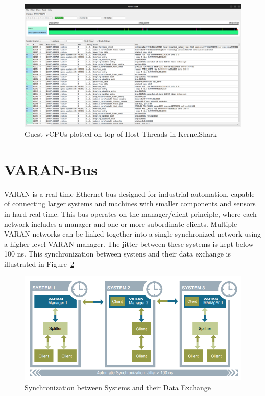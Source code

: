 \documentclass[MMR,Master,english]{twbook}
\begin{document}
\begin{figure}[H]
	\centering
	\includegraphics[width=1.0\columnwidth]{img/kernelshark_combo.png}
	\caption[Guest vCPUs plotted on top of Host Threads in KernelShark]{Guest vCPUs plotted on top of Host Threads in KernelShark}
	\label{fig:kernelshark_combo}
\end{figure}

\section{VARAN-Bus}\label{sec:varan}

VARAN is a real-time Ethernet bus designed for industrial automation, capable of connecting larger systems and machines with smaller components and sensors in hard real-time. This bus operates on the manager/client principle, where each network includes a manager and one or more subordinate clients. Multiple VARAN networks can be linked together into a single synchronized network using a higher-level VARAN manager. The jitter between these systems is kept below 100 ns. This synchronization between systens and their data exchange is illustrated in Figure~\ref{fig:multiple_varans}

\begin{figure}[H]
	\centering
	\includegraphics[width=0.75\columnwidth]{img/multiple_varans.png}
	\caption[Synchronization between Systems and their Data Exchange]{Synchronization between Systems and their Data Exchange}
	\label{fig:multiple_varans}
\end{figure}
\end{document}
